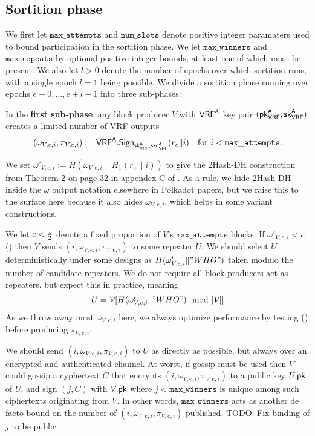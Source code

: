 \subsection{Sortition phase}\label{subsec:sortition_phase}
\newcommand{\vrfaattemptsbound}{\mathtt{max\_attempts}} %
\newcommand{\vrfawinnersbound}{\mathtt{max\_winners}} %
\newcommand{\vrfarepeatbound}{\mathtt{max\_repeats}} %
\newcommand{\vrfaslotsbound}{\mathtt{num\_slots}} %

We first let $\vrfaattemptsbound$ and $\vrfaslotsbound$ denote positive integer paramaters used to bound participation in the sortition phase.  We let $\vrfawinnersbound$ and $\vrfarepeatbound$ by optional positive integer bounds, at least one of which must be present.  We also let $l>0$ denote the number of epochs over which sortition runs, with a single epoch $l=1$ being possible.  We divide a sortition phase running over epochs $e+0,\ldots,e+l-1$ into three sub-phases:  

In the {\bf first sub-phase}, any block producer $V$ with $\mathsf{VRF}^{\mathsf{A}}$ key pair $(\mathsf{pk}_{\mathsf{VRF}}^{\mathsf{A}},\mathsf{sk}_{\mathsf{VRF}}^{\mathsf{A}})$ creates a limited number of VRF outputs 
$$ (\omega_{V,e,i},\pi_{V,e,i}) := \VRFa.\Sign_{\skvrfa,\skcvrfa}(r_e \| i) \quad \text{for $i < \vrfaattemptsbound$.} $$

We set $\omega'_{V,e,i} := H(\omega_{V,e,i} \| H_1(r_e \| i))$ to give the 2Hash-DH construction from Theorem 2 on page 32 in appendex C of \cite{Praos}.  As a rule, we hide 2Hash-DH inside the $\omega$ output notation elsewhere in Polkadot papers, but we raise this to the surface here because it also hides $\omega_{V,e,i}$, which helps in some variant constructions.

We let $c < {1\over2}$ denote a fixed proportion of $V$'s $\vrfaattemptsbound$ blocks.  If $\omega'_{V,e,i} < c$ (\dag) then $V$ sends $(i,\omega_{V,e,i},\pi_{V,e,i})$ to some repeater $U$.  We should select $U$ deterministically under some designs as $H(\omega'_{V,e,i} \| "WHO")$ taken modulo the number of candidate repeaters.  We do not require all block producers act as repeaters, but expect this in practice, meaning
$$ U = \mathcal{V}[H(\omega'_{V,e,i} \| "WHO") \mod |\mathcal{V}|] $$
As we throw away most $\omega_{V,e,i}$ here, we always optimize performance by testing (\dag) before producing $\pi_{V,e,i}$.  

We should send $(i,\omega_{V,e,i},\pi_{V,e,i})$ to $U$ as directly as possible, but always over an encrypted and authenticated channel.  At worst, if gossip must be used then $V$ could gossip a cyphertext $C$ that encrypts $(i,\omega_{V,e,i},\pi_{V,e,i})$ to a public key $U.\mathsf{pk}$ of $U$, and sign $(j,C)$ with $V.\mathsf{pk}$ where $j < \vrfawinnersbound$ is unique among such ciphertexts originating from $V$.  In other words, $\vrfawinnersbound$ acts as another de facto bound on the number of $(i,\omega_{V,e,i},\pi_{V,e,i})$ published.  
TODO: Fix binding of $j$ to be public

